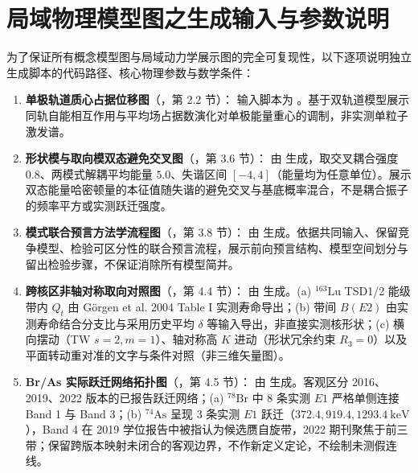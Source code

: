 \section{局域物理模型图之生成输入与参数说明}\label{sec:appF-additional-models}

为了保证所有概念模型图与局域动力学展示图的完全可复现性，以下逐项说明独立生成脚本的代码路径、核心物理参数与数学条件：
\begin{enumerate}[label=(\arabic*),leftmargin=2em]
    \item \textbf{单极轨道质心占据位移图}（，第 2.2 节）：
    输入脚本为 。基于双轨道模型展示同轨自能相互作用与平均场占据数演化对单极能量重心的调制，非实测单粒子激发谱。
    \vspace{1ex}
    \item \textbf{形状模与取向模双态避免交叉图}（，第 3.6 节）：
    由  生成，取交叉耦合强度 $0.8$、两模式解耦平均能量 $5.0$、失谐区间 $[-4, 4]$（能量均为任意单位）。展示双态能量哈密顿量的本征值随失谐的避免交叉与基底概率混合，不是耦合振子的频率平方或实测跃迁强度。
    \vspace{1ex}
    \item \textbf{模式联合预言方法学流程图}（，第 3.8 节）：
    由  生成。依据共同输入、保留竞争模型、检验可区分性的联合预言流程，展示前向预言结构、模型空间划分与留出检验步骤，不保证消除所有模型简并。
    \vspace{1ex}
    \item \textbf{跨核区非轴对称取向对照图}（，第 4.4 节）：
    由  生成。(a) $^{163}\mathrm{Lu}$ TSD1/2 能级带内 $Q_t$ 由 Görgen et al. 2004 Table I 实测寿命导出；(b) 带间 $B(E2)$ 由实测寿命结合分支比与采用历史平均 $\delta$ 等输入导出，非直接实测核形状；(c) 横向摆动（TW $s=2, m=1$）、轴对称高 $K$ 进动（形状冗余约束 $R_3=0$）以及平面转动重对准的文字与条件对照（非三维矢量图）。
    \vspace{1ex}
    \item \textbf{Br/As 实际跃迁网络拓扑图}（，第 4.5 节）：
    由  生成。客观区分 2016、2019、2022 版本的已报告跃迁网络；(a) $^{78}\mathrm{Br}$ 中 8 条实测 $E1$ 严格单侧连接 Band 1 与 Band 3；(b) $^{74}\mathrm{As}$ 呈现 3 条实测 $E1$ 跃迁（$372.4, 919.4, 1293.4\ \mathrm{keV}$），Band 4 在 2019 学位报告中被指认为候选赝自旋带，2022 期刊聚焦于前三带；保留跨版本映射未闭合的客观边界，不作新定义定论，不绘制未测假连线。

\end{enumerate}
